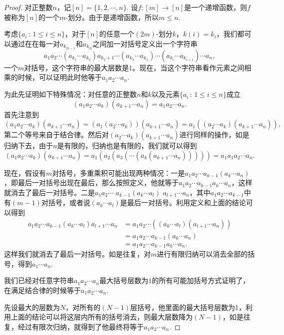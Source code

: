 \begin{proof} 对正整数$n$，记$[n]=\{1,2,\cdots,n\}$. 设$f:[m]\to [n]$是一个递增函数，则$f$被称为$[n]$的一个$m$-划分。由于是递增函数，所以$m\leq n$. 

考虑$\{a_i\, :\, 1\leq i\leq n\}$，对于$[n]$的任意一个$(2m)$-划分$k$，$k(i)=k_i$，我们都可以通过在在每一对$a_{k_{2i-1}}$和$a_{k_{2i}}$之间加一对括号定义出一个字符串
\[
	a_1a_2\cdots (a_{k_1}\cdots a_{k_2})a_{k_2+1}\cdots (a_{k_3}\cdots a_{k_4})\cdots (a_{k_i}\cdots a_{k_{i+1}})\cdots a_n,
\]
一个$m$对括号，这个字符串的最大层数是$1$。现在，当这个字符串看作元素之间相乘的时候，可以证明此时他等于$a_1a_2\cdots a_n$.

为此先证明如下特殊情况：对任意的正整数$n$和$k$以及元素$\{a_i\,:\, 1\leq i \leq n\}$成立
\[(a_1a_2\cdots a_{k})(a_{k+1}\cdots a_{n})=a_1a_2\cdots a_n.\]
首先注意到
\[
(a_1a_2\cdots a_{k})(a_{k+1}\cdots a_{n})=(a_1(a_2\cdots a_{k}))(a_{k+1}\cdots a_{n})=a_1((a_2\cdots a_{k})(a_{k+1}\cdots a_{n})),
\]
第二个等号来自于结合律。然后对$(a_2\cdots a_{k})(a_{k+1}\cdots a_{n})$进行同样的操作，如是归纳下去，由于$n$是有限的，归纳也是有限的，我们就可以得到
\[
(a_1a_2\cdots a_{k})(a_{k+1}\cdots a_{n})=a_1(a_2(a_3(\cdots (a_{k}(a_{k+1}\cdots a_{n})))))=a_1a_1a_2\cdots a_n.
\]

现在，假设有$m$对括号，多重乘积可能出现两种情况：一是$a_1a_2\cdots a_{k-1}(a_{k}\cdots a_n)$，即最后一对括号出现在最后，那么按照定义，他就等于$a_1a_2\cdots a_{k-1}a_{k}\cdots a_n$，这样就消去了最后一对括号。二是$a_1a_2\cdots$ $a_{k-1}(a_{k}\cdots a_l)$ $a_{l+1}\cdots a_n$，其中$a_1a_2\cdots a_{k-1}$中有$(m-1)$对括号，或者说$(a_{k}\cdots a_l)$是最后一对括号。利用定义和上面的结论可以得到
\begin{align*}
	a_1a_2\cdots a_{k-1}(a_{k}\cdots a_l)a_{l+1}\cdots a_n&=a_1a_2\cdots ((a_{k}\cdots a_l)(a_{l+1}\cdots a_n))\\
	&=a_1a_2\cdots a_{k-1}(a_{k}\cdots a_n)\\
	&=a_1a_2\cdots a_{k-1}a_{k}\cdots a_n.
\end{align*}
这样我们就消去了最后一对括号。如是往复，对$m$进行有限归纳可以消去全部的括号，得到$a_1\cdots a_n$.

我们已经对任意字符串$a_1a_2\cdots a_n$最大括号层数为$1$的所有可能加括号方式证明了，在满足结合律的时候等于$a_1a_2\cdots a_n$.

先设最大的层数为$N$，对所有的$(N-1)$层括号，他里面的最大括号层数为1，利用上面的结论可以将这层内所有的括号消去，则最大层数降为$(N-1)$，如是往复，经过有限次归纳，就得到了他最终将等于$a_1a_2\cdots a_n$.\end{proof} 

